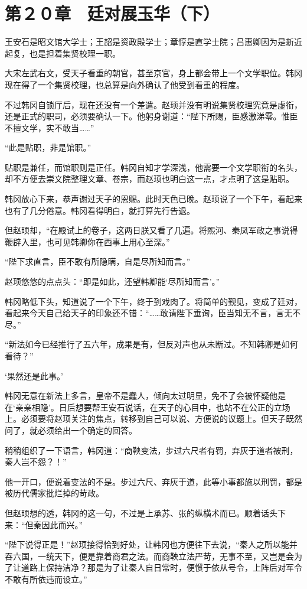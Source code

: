 \section{第２０章　廷对展玉华（下）}

王安石是昭文馆大学士；王韶是资政殿学士；章惇是直学士院；吕惠卿因为是新近起复，也是担着集贤校理一职。

大宋左武右文，受天子看重的朝官，甚至京官，身上都会带上一个文学职位。韩冈现在得了一个集贤校理，也总算是向外确认了他受到看重的程度。

不过韩冈自锁厅后，现在还没有一个差遣。赵顼并没有明说集贤校理究竟是虚衔，还是正式的职司，必须要确认一下。他躬身谢道：“陛下所赐，臣感激涕零。惟臣不擅文学，实不敢当……”

“此是贴职，非是馆职。”

贴职是兼任，而馆职则是正任。韩冈自知才学深浅，他需要一个文学职衔的名头，却不方便去崇文院整理文章、卷宗，而赵顼也明白这一点，才点明了这是贴职。

韩冈放心下来，恭声谢过天子的恩赐。此时天色已晚。赵顼说了一个下午，看起来也有了几分倦意。韩冈看得明白，就打算先行告退。

但赵顼却，“在殿试上的卷子，这两日朕又看了几遍。将熙河、秦凤军政之事说得鞭辟入里，也可见韩卿你在西事上用心至深。”

“陛下求直言，臣不敢有所隐瞒，自是尽所知而言。”

赵顼悠悠的点点头：“即是如此，还望韩卿能‘尽所知而言’。”

韩冈略低下头，知道说了一个下午，终于到戏肉了。将简单的觐见，变成了廷对，看起来今天自己给天子的印象还不错：“……敢请陛下垂询，臣当知无不言，言无不尽。”

“新法如今已经推行了五六年，成果是有，但反对声也从未断过。不知韩卿是如何看待？”

‘果然还是此事。’

韩冈无意在新法上多言，皇帝不是蠢人，倾向太过明显，免不了会被怀疑他是在‘亲亲相隐’。日后想要帮王安石说话，在天子的心目中，也站不在公正的立场上。必须要将赵顼关注的焦点，转移到自己可以说、方便说的议题上。但天子既然问了，就必须给出一个确定的回答。

稍稍组织了一下语言，韩冈道：“商鞅变法，步过六尺者有罚，弃灰于道者被刑，秦人岂不怨？！”

他一开口，便说着变法的不是。步过六尺、弃灰于道，此等小事都施以刑罚，都是被历代儒家批烂掉的苛政。

但赵顼想的透，韩冈的这一句，不过是上承苏、张的纵横术而已。顺着话头下来：“但秦因此而兴。”

“陛下说得正是！”赵顼接得恰到好处，让韩冈也方便往下去说，“秦人之所以能并吞六国，一统天下，便是靠着商君之法。而商鞅立法严苛，无事不至，又岂是会为了让道路上保持洁净？那是为了让秦人自日常时，便惯于依从号令，上阵后对军令不敢有所依违而设立。”

